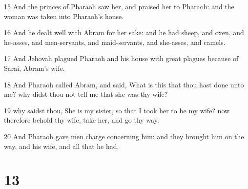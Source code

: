 \par 15 And the princes of Pharaoh saw her, and praised her to Pharaoh: and the woman was taken into Pharaoh's house.
\par 16 And he dealt well with Abram for her sake: and he had sheep, and oxen, and he-asses, and men-servants, and maid-servants, and she-asses, and camels.
\par 17 And Jehovah plagued Pharaoh and his house with great plagues because of Sarai, Abram's wife.
\par 18 And Pharaoh called Abram, and said, What is this that thou hast done unto me? why didst thou not tell me that she was thy wife?
\par 19 why saidst thou, She is my sister, so that I took her to be my wife? now therefore behold thy wife, take her, and go thy way.
\par 20 And Pharaoh gave men charge concerning him: and they brought him on the way, and his wife, and all that he had.

\chapter{13}

